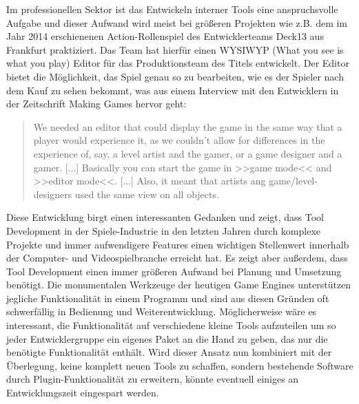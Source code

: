 \documentclass[pagesize, paper=a4, fontsize=12pt, titlepage=true, headings=small, headnosepline, abstractoff, liststotoc, nochapterprefix, plainheadsepline, twoside]{scrreprt}
\begin{document}
Im professionellen Sektor ist das Entwickeln interner Tools eine anspruchsvolle Aufgabe und dieser Aufwand wird meist bei größeren Projekten wie z.B. dem im Jahr 2014 erschienenen Action-Rollenspiel  des Entwicklerteams Deck13 aus Frankfurt praktiziert. Das Team hat hierfür einen WYSIWYP (What you see is what you play) Editor für das Produktionsteam des Titels entwickelt. Der Editor bietet die Möglichkeit, das Spiel genau so zu bearbeiten, wie es der Spieler nach dem Kauf zu sehen bekommt, was aus einem Interview mit den Entwicklern in der Zeitschrift Making Games hervor geht:
\begin{quote}
\glqq We needed an editor that could display the game in the same way that a player would experience it, as we couldn’t allow for differences in the experience of, say, a level artist and the gamer, or a game designer and a gamer. [...] Basically you can start the game in >>game mode<< and >>editor mode<<.  [...] Also, it meant that artists ang game/level-designers used the same view on all objects.\grqq{}

\end{quote}
Diese Entwicklung birgt einen interessanten Gedanken und zeigt, dass Tool Development in der Spiele-Industrie in den letzten Jahren durch komplexe Projekte und immer aufwendigere Features einen wichtigen Stellenwert innerhalb der Computer- und Videospielbranche erreicht hat. Es zeigt aber außerdem, dass Tool Development einen immer größeren Aufwand bei Planung und Umsetzung benötigt. Die monumentalen Werkzeuge der heutigen Game Engines unterstützen jegliche Funktionalität in einem Programm und sind aus diesen Gründen oft schwerfällig in Bedienung und Weiterentwicklung. Möglicherweise wäre es interessant, die Funktionalität auf verschiedene kleine Tools aufzuteilen um so jeder Entwicklergruppe ein eigenes Paket an die Hand zu geben, das nur die benötigte Funktionalität enthält. Wird dieser Ansatz nun kombiniert mit der Überlegung, keine komplett neuen Tools zu schaffen, sondern bestehende Software durch Plugin-Funktionalität zu erweitern, könnte eventuell einiges an Entwicklungszeit eingespart werden.
\end{document}
